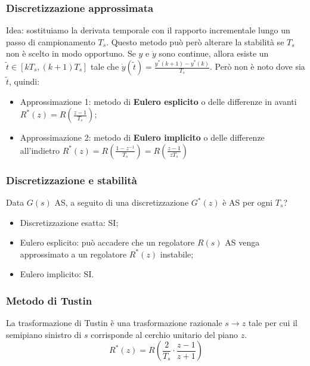 \begin{landscape}
\begin{multicols*}{2}
    \subsubsection{Discretizzazione approssimata}
    Idea: sostituiamo la derivata temporale con il rapporto incrementale lungo un passo di campionamento $T_s$.\newline
    Questo metodo può però alterare la stabilità se $T_s$ non è scelto in modo opportuno.\newline
    \newline
    Se $y$ e $\dot{y}$ sono continue, allora esiste un $\tilde{t} \in [kT_s, (k+1) T_s]$ tale che $\dot{y}(\tilde{t}) = \frac{y^*(k+1) - y^*(k)}{T_s}$.\newline
    \newline
    Però non è noto dove sia $\tilde{t}$, quindi:
    \begin{itemize}
        \item Approssimazione 1: metodo di \textbf{Eulero esplicito} o delle differenze in avanti $R^*(z) = R\left(\frac{z-1}{T_s}\right)$;
        \item Approssimazione 2: metodo di \textbf{Eulero implicito} o delle differenze all'indietro $R^*(z) = R\left(\frac{1-z^{-1}}{T_s}\right) = R\left(\frac{z-1}{z T_s}\right)$
    \end{itemize}
    \subsubsection{Discretizzazione e stabilità}
    Data $G(s)$ AS, a seguito di una discretizzazione $G^*(z)$ è AS per ogni $T_s$?
    \begin{itemize}
        \item Discretizzazione esatta: SI;
        \item Eulero esplicito: può accadere che un regolatore $R(s)$ AS venga approssimato a un regolatore $R^*(z)$ instabile;
        \item Eulero implicito: SI.
    \end{itemize}
    \subsubsection{Metodo di Tustin}
    La trasformazione di Tustin è una trasformazione razionale $s \rightarrow z$ tale per cui il semipiano sinistro di $s$ corrisponde al cerchio unitario del piano $z$.
    \[
        R^*(z) = R( \frac{2}{T_s} \cdot \frac{z-1}{z+1})
    \]

\end{multicols*}
\end{landscape}
